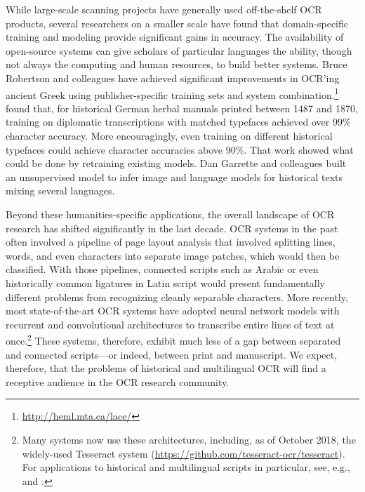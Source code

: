 \documentclass[twoside,11pt]{report}
\begin{document}
While large-scale scanning projects have generally used off-the-shelf OCR products, several researchers on a smaller scale have found that domain-specific training and modeling provide significant gains in accuracy. The availability of open-source systems can give  scholars of particular languages the ability, though not always the computing and human resources, to build better systems. Bruce Robertson and colleagues have achieved significant improvements in OCR'ing ancient Greek using publisher-specific training sets and system combination.\footnote{\url{http://heml.mta.ca/lace/}}  \cite{springmann17:_ocr_histor_print_applic_build_diach_corpor} found that, for historical German herbal manuals printed between 1487 and 1870, training on diplomatic transcriptions with matched typefaces achieved over 99\% character accuracy. More encouragingly, even training on different historical typefaces could achieve character accuracies above 90\%. That work showed what could be done by retraining existing models. Dan Garrette and colleagues \citeyearpar{garrette15:_unsup_code_switc_multil_histor_docum_trans} built an unsupervised model to infer image and language models for historical texts mixing several languages.

Beyond these humanities-specific applications, the overall landscape of OCR research has shifted significantly in the last decade. OCR systems in the past often involved a pipeline of page layout analysis that involved splitting lines, words, and even characters into separate image patches, which would then be classified. With those pipelines, connected scripts such as Arabic or even historically common ligatures in Latin script would present fundamentally different problems from recognizing cleanly separable characters. More recently, most state-of-the-art OCR systems have adopted neural network models with recurrent and convolutional architectures to transcribe entire lines of text at once.\footnote{Many systems now use these architectures, including, as of October 2018, the widely-used Tesseract system (\url{https://github.com/tesseract-ocr/tesseract}).  For applications to historical and multilingual scripts in particular, see, e.g., \cite{breuel13:_high_ocr_print_englis_frakt_lstm_networ} and \cite{kiessling17:_impor_new_devel_arabog_optic}.}  These systems, therefore, exhibit much less of a gap between separated and connected scripts---or indeed, between print and manuscript. We expect, therefore, that the problems of historical and multilingual OCR will find a receptive audience in the OCR research community.
\end{document}
